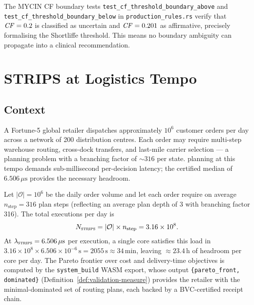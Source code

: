 \begin{remark}
\label{rem:mycin-cf-boundary}
The MYCIN CF boundary tests \texttt{test\_cf\_threshold\_boundary\_above} and
\texttt{test\_cf\_threshold\_boundary\_below} in \texttt{production\_rules.rs} verify that
$\mathit{CF} = 0.2$ is classified as uncertain and $\mathit{CF} = 0.201$ as affirmative, precisely
formalising the Shortliffe threshold. This means no boundary ambiguity can propagate into
a clinical recommendation.
\end{remark}

\section{STRIPS at Logistics Tempo}
\label{sec:strips-logistics}

\subsection{Context}
\label{subsec:strips-context}

A Fortune-5 global retailer dispatches approximately $10^6$ customer orders per day across
a network of 200 distribution centres. Each order may require multi-step warehouse routing,
cross-dock transfers, and last-mile carrier selection — a planning problem with a branching
factor of $\sim 316$ per state. \STRIPS{} planning at this tempo demands sub-millisecond
per-decision latency; the certified median of $6.506\,\mu\mathrm{s}$ provides the
necessary headroom.

\begin{proposition}
\label{prop:strips-logistics}
Let $|\mathcal{O}| = 10^6$ be the daily order volume and let each order require on
average $n_{\mathrm{step}} = 316$ \STRIPS{} plan steps (reflecting an average plan depth
of 3 with branching factor 316). The total \STRIPS{} executions per day is
\[
  N_{\textsc{strips}}
  = |\mathcal{O}| \times n_{\mathrm{step}}
  = 3.16 \times 10^8.
\]
At $\lambda_{\textsc{strips}} = 6.506\,\mu\mathrm{s}$ per execution, a single core satisfies
this load in $3.16 \times 10^8 \times 6.506 \times 10^{-6}\,\mathrm{s}
= 2055\,\mathrm{s} \approx 34\,\mathrm{min}$, leaving $\approx 23.4\,\mathrm{h}$
of headroom per core per day. The Pareto frontier over cost and delivery-time
objectives is computed by the \texttt{system\_build} WASM export, whose output
\texttt{\{pareto\_front, dominated\}} (Definition~\ref{def:validation-measure})
provides the retailer with the minimal-dominated set of routing plans, each backed by
a BVC-certified receipt chain.
\end{proposition}

